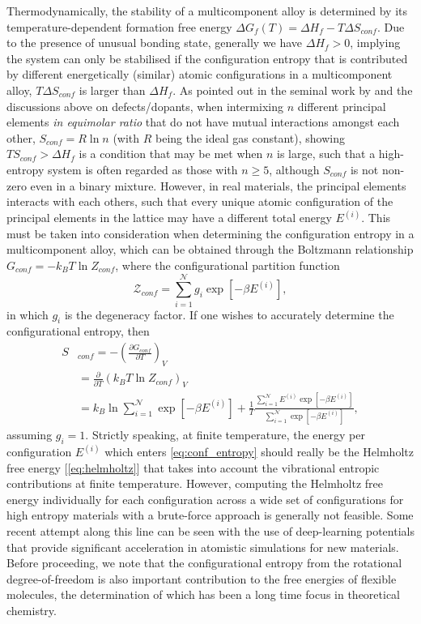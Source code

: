 Thermodynamically, the stability of a multicomponent alloy is determined by its temperature-dependent formation free energy $\Delta G_f(T)=\Delta H_f-T\Delta S_{conf}$. Due to the presence of unusual bonding state, generally we have $\Delta H_f>0$, implying the system can only be stabilised if the configuration entropy that is contributed by different energetically (similar) atomic configurations in a multicomponent alloy, $T\Delta S_{conf}$ is larger than $\Delta H_f$. As pointed out in the seminal work by \citet{yeh2004nanostructured} and the discussions above on defects/dopants, when intermixing $n$ different principal elements \textit{in equimolar ratio} that do not have mutual interactions amongst each other, $S_{conf}=R\ln n$ (with $R$ being the ideal gas constant), showing $TS_{conf}>\Delta H_f$ is a condition that may be met when $n$ is large, such that a high-entropy system is often regarded as those with $n\geq 5$, although  $S_{conf}$ is not non-zero even in a binary mixture. However, in real materials, the principal elements interacts with each others, such that every unique atomic configuration of the principal elements in the lattice may have a different total energy $E^{(i)}$. This must be taken into consideration when determining the configuration entropy in a multicomponent alloy, which can be obtained through the Boltzmann relationship $G_{conf}=-k_{B}T\ln Z_{conf}$, where the configurational partition function
\begin{equation}\label{eq:configuration_partiton_function}
\mathcal{Z}_{conf}=\sum_{i=1}^{\mathcal{N}}g_{i}\exp[-\beta E^{(i)}],
\end{equation}
in which $g_i$ is the degeneracy factor. If one wishes to accurately determine the configurational entropy, then
\begin{align}\label{eq:conf_entropy}
    S&_{conf}=-\left(\frac{\partial G_{conf}}{\partial T}\right)_V\nonumber\\
    &=\frac{\partial}{\partial T}(k_{B}T\ln Z_{conf})_V\nonumber\\
    &=k_B \ln \sum_{i=1}^{\mathcal{N}}\exp[-\beta E^{(i)}]+\frac{1}{T}\frac{\sum_{i=1}^{\mathcal{N}}E^{(i)} \exp[-\beta E^{(i)}]}{\sum_{i=1}^{\mathcal{N}}\exp[-\beta E^{(i)}]},
\end{align}
assuming $g_i=1$. Strictly speaking, at finite temperature, the energy per configuration $E^{(i)}$ which enters \cref{eq:conf_entropy} should really be the Helmholtz free energy [\cref{eq:helmholtz}] that takes into account the vibrational entropic contributions at finite temperature.\cite{van2002effect} However, computing the Helmholtz free energy individually for each configuration across a wide set of configurations for high entropy materials with a brute-force approach is generally not feasible. Some recent attempt\cite{yang2025accounting} along this line can be seen with the use of deep-learning potentials that provide significant acceleration in atomistic simulations for new materials.  
Before proceeding, we note that the configurational entropy from the rotational degree-of-freedom is also important contribution to the free energies of flexible molecules, the determination of which has been a long time focus in theoretical chemistry.\cite{karplus1981method,hnizdo2008efficient,pracht2021calculation}
 
